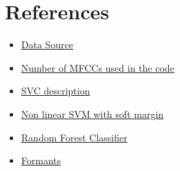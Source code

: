 \documentclass{article}
\begin{document}
\section*{References}
\begin{itemize}
    \item \href{https://huggingface.co/datasets/common_language}{Data Source}
    
    \item \href{https://ietresearch.onlinelibrary.wiley.com/doi/full/10.1049/tje2.12082#:~:text=All\%20performance\%20metrics\%20gave\%20the,studies\%20use\%20only\%2013\%20MFCCs}{Number of MFCCs used in the code}

    \item \href{https://scikit-learn.org/stable/modules/generated/sklearn.svm.SVC.html}{SVC description}
    
    \item \href{https://scikit-learn.org/stable/modules/svm.html#svm-kernels}{Non linear SVM with soft margin}
    
    \item \href{https://scikit-learn.org/stable/modules/generated/sklearn.ensemble.RandomForestClassifier.html}{Random Forest Classifier}
    \item \href{}{Formants}
\end{itemize}
\end{document}
